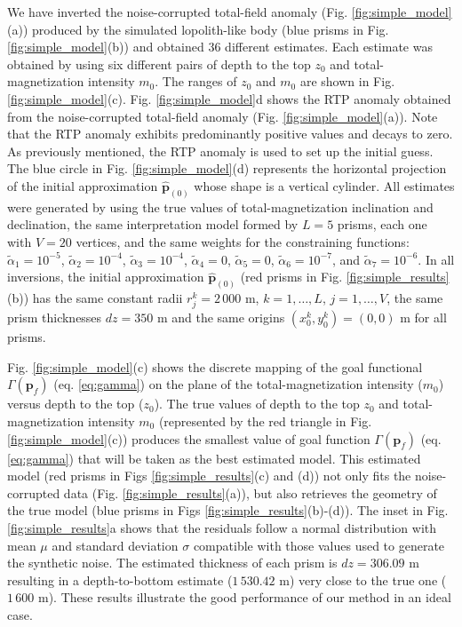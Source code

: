 We have inverted the noise-corrupted total-field anomaly (Fig. \ref{fig:simple_model}(a)) produced by the simulated lopolith-like body (blue prisms in Fig. \ref{fig:simple_model}(b)) and obtained 36 different estimates. 
Each estimate was obtained by using six different pairs of depth to the top $ z_0 $ and total-magnetization intensity $ m_0 $.
The ranges of $ z_0 $ and $ m_0 $ are shown in Fig. \ref{fig:simple_model}(c). 
Fig. \ref{fig:simple_model}d shows the RTP anomaly obtained from the noise-corrupted 
total-field anomaly (Fig. \ref{fig:simple_model}(a)).
Note that the RTP anomaly exhibits predominantly positive values and decays to zero.
As previously mentioned, the RTP anomaly is used to set up the initial guess. 
The blue circle in Fig. \ref{fig:simple_model}(d) represents the horizontal projection 
of the initial approximation $\hat{\mathbf{p}}_{(0)}$ whose shape is a vertical cylinder.
All estimates were generated by using the true values of total-magnetization inclination and declination, the same interpretation model formed by $ L = 5 $ prisms, 
each one with $ V = 20 $ vertices, and the same weights for the constraining functions: 
$\tilde{\alpha}_1 = 10^{-5}$, 
$\tilde{\alpha}_2 = 10^{-4}$, 
$\tilde{\alpha}_3 = 10^{-4}$, 
$\tilde{\alpha}_4 = 0$, 
$\tilde{\alpha}_5 = 0$, 
$\tilde{\alpha}_6 = 10^{-7}$, and 
$\tilde{\alpha}_7 = 10^{-6}$. 
In all inversions, the initial approximation $\hat{\mathbf{p}}_{(0)}$ (red prisms in Fig. \ref{fig:simple_results}(b)) has the same constant radii $ r^k_j = 2\,000 $ m, 
$ k = 1, \dots, L $, $ j = 1, \dots, V $, the same prism thicknesses $ dz = 350 $ m and the same origins $(x^k_0, y^k_0) = (0, 0) $ m for all prisms.

Fig. \ref{fig:simple_model}(c) shows the discrete mapping of the goal functional 
$ \Gamma(\mathbf{p}_f) $ (eq. \ref{eq:gamma}) on the plane of the total-magnetization intensity ($ m_0 $) versus depth to the top ($ z_0 $). 
The true values of depth to the top $ z_0 $ and total-magnetization intensity $ m_0 $ (represented by the red triangle in Fig. \ref{fig:simple_model}(c)) produces 
the smallest value of goal function $ \Gamma(\mathbf{p}_f) $ (eq. \ref{eq:gamma})
that will be taken as the best estimated model.
This estimated model (red prisms in Figs \ref{fig:simple_results}(c) and (d)) 
not only fits the noise-corrupted data (Fig. \ref{fig:simple_results}(a)), 
but also retrieves the geometry of the true model (blue prisms in Figs \ref{fig:simple_results}(b)-(d)). 
The inset in Fig. \ref{fig:simple_results}a shows that the residuals follow a normal distribution with mean $ \mu $ and standard deviation $ \sigma $ compatible with those values used to generate the synthetic noise. 
The estimated thickness of each prism is $ dz = 306.09 $ m resulting in a depth-to-bottom estimate ($ 1\,530.42$ m) very close to the true one ($ 1\,600 $ m). 
These results illustrate the good performance of our method in an ideal case.


